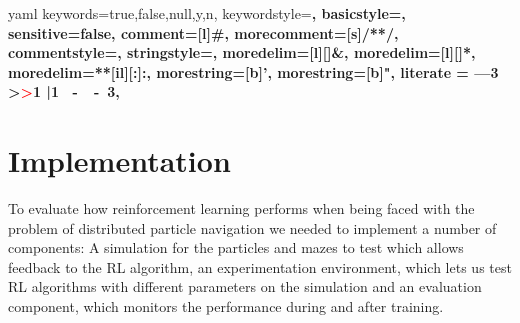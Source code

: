 
\newcommand\YAMLcolonstyle{\color{black}\bfseries\small}
\newcommand\YAMLkeystyle{\color{black}\mdseries\small}
\newcommand\YAMLvaluestyle{\color{green}\mdseries\small}

\makeatletter

\newcommand\language@yaml{yaml}

\expandafter\expandafter\expandafter\lstdefinelanguage
\expandafter{\language@yaml}
{
  keywords={true,false,null,y,n},
  keywordstyle=\color{darkgray}\bfseries,
  basicstyle=\YAMLkeystyle,                                 %
  sensitive=false,
  comment=[l]{\#},
  morecomment=[s]{/*}{*/},
  commentstyle=\color{purple}\ttfamily,
  stringstyle=\YAMLvaluestyle\ttfamily,
  moredelim=[l][\color{orange}]{\&},
  moredelim=[l][\color{magenta}]{*},
  moredelim=**[il][\YAMLcolonstyle{:}\YAMLvaluestyle]{:},   %
  morestring=[b]',
  morestring=[b]",
  literate =    {---}{{\ProcessThreeDashes}}3
                {>}{{\textcolor{red}\textgreater}}1     
                {|}{{\textcolor{red}\textbar}}1 
                {\ -\ }{{\mdseries\ -\ }}3,
}

\lst@AddToHook{EveryLine}{\ifx\lst@language\language@yaml\YAMLkeystyle\fi}
\makeatother

\newcommand\ProcessThreeDashes{\llap{\color{cyan}\mdseries-{-}-}}




\lstset{style=mystyle}

\chapter{Implementation} \label{chp:Implementation}
To evaluate how reinforcement learning performs when being faced with the problem of distributed particle navigation we needed to implement a number of components: A simulation for the particles and mazes to test which allows feedback to the RL algorithm, an experimentation environment, which lets us test RL algorithms with different parameters on the simulation and an evaluation component, which monitors the performance during and after training.

